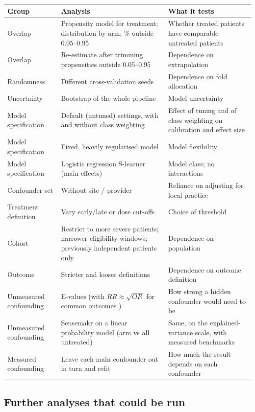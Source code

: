 \begin{xltabular}{\textwidth}{L{2.6cm}YY}
\toprule
\textbf{Group} & \textbf{Analysis} & \textbf{What it tests} \\
\midrule
\endhead
Overlap & Propensity model for treatment; distribution by arm; \% outside 0.05--0.95 & Whether treated patients have comparable untreated patients \\
Overlap & Re-estimate after trimming propensities outside 0.05--0.95 \cite{crump2009} & Dependence on extrapolation \\
Randomness & Different cross-validation seeds & Dependence on fold allocation \\
Uncertainty & Bootstrap of the whole pipeline & Model uncertainty \\
Model specification & Default (untuned) settings, with and without class weighting & Effect of tuning and of class weighting on calibration and effect size \\
Model specification & Fixed, heavily regularised model & Model flexibility \\
Model specification & Logistic regression S-learner (main effects) & Model class; no interactions \\
Confounder set & Without site / provider & Reliance on adjusting for local practice \\
Treatment definition & Vary early/late or dose cut-offs & Choice of threshold \\
Cohort & Restrict to more severe patients; narrower eligibility windows; previously independent patients only & Dependence on population \\
Outcome & Stricter and looser definitions & Dependence on outcome definition \\
Unmeasured confounding & E-values \cite{vanderweele2017evalue} (with $RR \approx \sqrt{OR}$ for common outcomes \cite{vanderweele2017sqrt}) & How strong a hidden confounder would need to be \\
Unmeasured confounding & Sensemakr \cite{cinelli2020} on a linear probability model (arm vs all untreated) & Same, on the explained-variance scale, with measured benchmarks \\
Measured confounding & Leave each main confounder out in turn and refit & How much the result depends on each confounder \\
\bottomrule
\end{xltabular}

\subsection{Further analyses that could be run}


